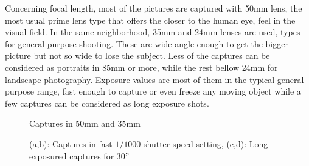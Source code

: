 Concerning focal length, most of the pictures are captured with 50mm lens, the most usual prime lens type that offers the closer to the human eye, feel in the visual field. In the same neighborhood, 35mm and 24mm lenses are used, types for general purpose shooting. These are wide angle enough to get the bigger picture but not so wide to lose the subject. Less of the captures can be considered as portraits in 85mm or more, while the rest bellow 24mm for landscape photography.
Exposure values are most of them in the typical general purpose range, fast enough to capture or even freeze any moving object while a few captures can be considered as long exposure shots.

\begin{figure}[ht!]
    \centering  
    \caption{Captures in $50$mm and $35$mm}
    \label{c4:focal_captures}
\end{figure}


\begin{figure}[ht!]
    \centering  
    \caption{(a,b): Captures in fast $1/1000$ shutter speed setting, (c,d): Long exposured captures for 30''}
    \label{c4:fast_shutter_captures}
\end{figure}




